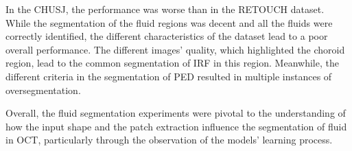 \par
In the CHUSJ, the performance was worse than in the RETOUCH dataset. While the segmentation of the fluid regions was decent and all the fluids were correctly identified, the different characteristics of the dataset lead to a poor overall performance. The different images' quality, which highlighted the choroid region, lead to the common segmentation of IRF in this region. Meanwhile, the different criteria in the segmentation of PED resulted in multiple instances of oversegmentation.
\par
Overall, the fluid segmentation experiments were pivotal to the understanding of how the input shape and the patch extraction influence the segmentation of fluid in OCT, particularly through the observation of the models' learning process. 



